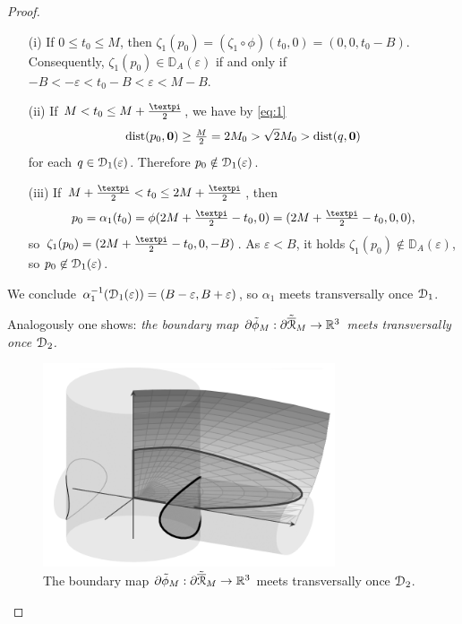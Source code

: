 \documentclass[10pt,twoside]{homg3} %
\newcommand{\Dd}{{\EuScript D}}
\newcommand{\Rr}{{\EuScript R}}
\renewcommand{\R}{\mathbb{R}}
\begin{document}
\begin{proof}
\begin{itemize}
\item[(i)] If $0\le t_0\le M$, then $\zeta_1(p_0)=(\zeta_1\circ\phi)(t_0,0)=(0,0,t_0-B)$. Consequently, $\zeta_1(p_0)\in{\mathbb D}_A(\varepsilon)$ if and only if $-B<-\varepsilon<t_0-B<\varepsilon<M-B$. 

\item[(ii)] If $M<t_0\le M+\frac{\text{\textpi}}{2}$, we have by \eqref{eq:1}
$$
\mathop{\hbox{\rm dist}}\nolimits(p_0,{\bf0})\geq\tfrac{M}{2}=2M_0>\sqrt{2}M_0>\mathop{\hbox{\rm dist}}\nolimits(q,{\bf0})
$$ 
for each $q\in\Dd_1(\varepsilon)$. Therefore $p_0\notin\Dd_1(\varepsilon)$.

\item[(iii)] If $M+\frac{\text{\textpi}}{2}<t_0\le 2M+\frac{\text{\textpi}}{2}$, then 
$$
p_0=\alpha_1(t_0)=\phi(2M+\tfrac{\text{\textpi}}{2}-t_0,0)=(2M+\tfrac{\text{\textpi}}{2}-t_0,0,0),
$$ 
so $\zeta_1(p_0)=(2M+\tfrac{\text{\textpi}}{2}-t_0,0,-B)$. As $\varepsilon<B$, it holds $\zeta_1(p_0)\not\in{\mathbb D}_A(\varepsilon)$, so $p_0\not\in\Dd_1(\varepsilon)$.
\end{itemize}
We conclude $\alpha_1^{-1}(\Dd_1(\varepsilon))=(B-\varepsilon,B+\varepsilon)$, so $\alpha_1$ meets transversally once $\Dd_1$. 

\vspace{2mm}
Analogously one shows: \em the boundary map $\partial\tilde{\phi}_M:\partial\tilde{\overline{\Rr}}_M\rightarrow\R^3$ meets transversally once $\Dd_2$\em.

\begin{figure}[!ht]
\begin{center}
\includegraphics[height=6cm]{dibmont_A2.png}
\end{center}
\caption{The boundary map $\partial\tilde{\phi}_M:\partial\tilde{\overline{\Rr}}_M\rightarrow\R^3$ meets transversally once $\Dd_2$.}
\end{figure}


\end{proof}
\end{document}
